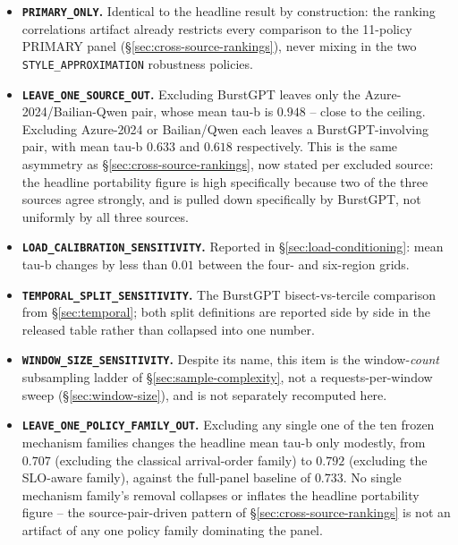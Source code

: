 \begin{itemize}
  \item \textbf{\texttt{PRIMARY\_ONLY}.} Identical to the headline result
    by construction: the ranking correlations artifact already restricts
    every comparison to the 11-policy PRIMARY panel
    (\S\ref{sec:cross-source-rankings}), never mixing in the two
    \texttt{STYLE\_APPROXIMATION} robustness policies.
  \item \textbf{\texttt{LEAVE\_ONE\_SOURCE\_OUT}.} Excluding BurstGPT
    leaves only the Azure-2024/Bailian-Qwen pair, whose mean tau-b is
    $0.948$ -- close to the ceiling. Excluding Azure-2024 or Bailian/Qwen
    each leaves a BurstGPT-involving pair, with mean tau-b $0.633$ and
    $0.618$ respectively. This is the same asymmetry as
    \S\ref{sec:cross-source-rankings}, now stated per excluded source: the
    headline portability figure is high specifically because two of the
    three sources agree strongly, and is pulled down specifically by
    BurstGPT, not uniformly by all three sources.
  \item \textbf{\texttt{LOAD\_CALIBRATION\_SENSITIVITY}.} Reported in
    \S\ref{sec:load-conditioning}: mean tau-b changes by less than $0.01$
    between the four- and six-region grids.
  \item \textbf{\texttt{TEMPORAL\_SPLIT\_SENSITIVITY}.} The BurstGPT
    bisect-vs-tercile comparison from \S\ref{sec:temporal}; both split
    definitions are reported side by side in the released table rather
    than collapsed into one number.
  \item \textbf{\texttt{WINDOW\_SIZE\_SENSITIVITY}.} Despite its name,
    this item is the window-\emph{count} subsampling ladder of
    \S\ref{sec:sample-complexity}, not a requests-per-window sweep
    (\S\ref{sec:window-size}), and is not separately recomputed here.
  \item \textbf{\texttt{LEAVE\_ONE\_POLICY\_FAMILY\_OUT}.} Excluding any
    single one of the ten frozen mechanism families changes the headline
    mean tau-b only modestly, from $0.707$ (excluding the classical
    arrival-order family) to $0.792$ (excluding the SLO-aware family),
    against the full-panel baseline of $0.733$. No single mechanism
    family's removal collapses or inflates the headline portability
    figure -- the source-pair-driven pattern of
    \S\ref{sec:cross-source-rankings} is not an artifact of any one
    policy family dominating the panel.
\end{itemize}

